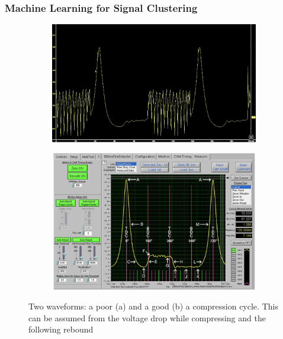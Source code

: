 \documentclass[conference,a4paper]{IEEEtran}
\begin{document}
\subsubsection{Machine Learning for Signal Clustering}
\begin{figure}[ht]
  \centering
  
  \begin{subfigure}[b]{0.9\linewidth}
    \includegraphics[width=\linewidth]{figures/bad_enhanced.png}
    \caption{}
  \end{subfigure}
  \vspace{0.5em}
  \begin{subfigure}[b]{0.9\linewidth}
    \includegraphics[width=\linewidth]{figures/good.jpeg}
    \caption{}
  \end{subfigure}

  \caption{Two waveforms: a poor (a) and a good (b) a compression cycle. This can be assumed from the voltage drop while compressing and the following rebound}
  \label{fig:waveforms_good_bad}
\end{figure}
\end{document}
